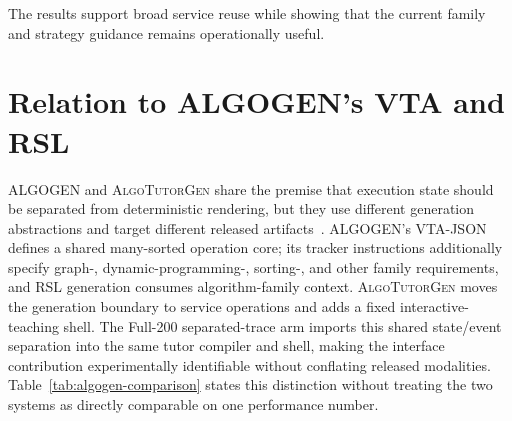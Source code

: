 \documentclass[letterpaper]{article}
\newcommand{\system}{\textsc{AlgoTutorGen}}
\begin{document}
The results support broad service reuse while
showing that the current family and strategy guidance remains
operationally useful.

\section{Relation to ALGOGEN's VTA and RSL}

ALGOGEN and \system{} share the premise that execution state should be separated from deterministic rendering, but they use different generation abstractions and target different released artifacts~\cite{anonymous-etal-2026-algogen}. ALGOGEN's VTA-JSON defines a shared many-sorted operation core; its tracker instructions additionally specify graph-, dynamic-programming-, sorting-, and other family requirements, and RSL generation consumes algorithm-family context. \system{} moves the generation boundary to service operations and adds a fixed interactive-teaching shell. The Full-200 separated-trace arm imports this shared state/event separation into the same tutor compiler and shell, making the interface contribution experimentally identifiable without conflating released modalities. Table~\ref{tab:algogen-comparison} states this distinction without treating the two systems as directly comparable on one performance number.
\end{document}
